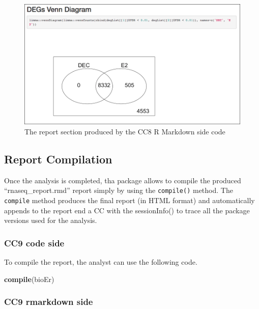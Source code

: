\documentclass[]{article}
\newenvironment{Shaded}{\begin{snugshade}}{\end{snugshade}}
\newcommand{\KeywordTok}[1]{\textcolor[rgb]{0.13,0.29,0.53}{\textbf{#1}}}
\newcommand{\NormalTok}[1]{#1}
\begin{document}
\begin{figure}[ht]

{\centering \includegraphics[width=0.95\linewidth]{imgs/8} 

}

\caption{The report section produced by the CC8 R Markdown side code}\label{fig:unnamed-chunk-18}
\end{figure}

\hypertarget{report-compilation}{%
\subsection{Report Compilation}\label{report-compilation}}

Once the analysis is completed, tha package allows to compile the
produced ``rnaseq\_report.rmd'' report simply by using the
\texttt{compile()} method. The \texttt{compile} method produces the
final report (in HTML format) and automatically appends to the report
end a CC with the sessionInfo() to trace all the package versions used
for the analysis.

\hypertarget{cc9-code-side}{%
\subsubsection{CC9 code side}\label{cc9-code-side}}

To compile the report, the analyst can use the following code.

\begin{Shaded}
\begin{Highlighting}[]
\KeywordTok{compile}\NormalTok{(bioEr)}
\end{Highlighting}
\end{Shaded}

\newpage

\hypertarget{cc9-rmarkdown-side}{%
\subsubsection{CC9 rmarkdown side}\label{cc9-rmarkdown-side}}
\end{document}
